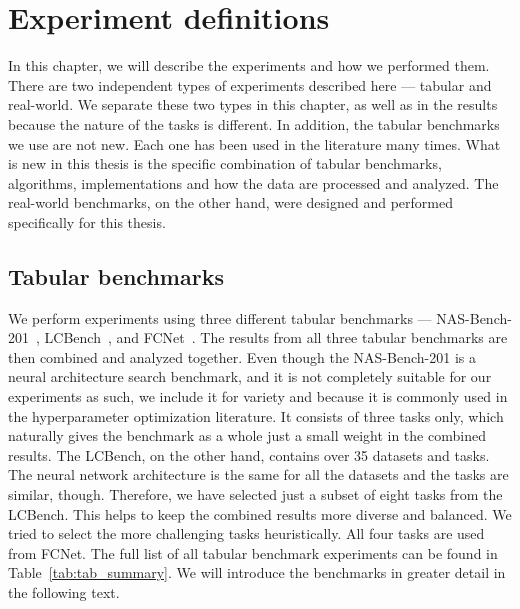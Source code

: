 \chapter{Experiment definitions}
In this chapter, we will describe the experiments and how we performed them. There are two independent types of experiments described here --- tabular and real-world. We separate these two types in this chapter, as well as in the results because the nature of the tasks is different. In addition, the tabular benchmarks we use are not new. Each one has been used in the literature many times. What is new in this thesis is the specific combination of tabular benchmarks, algorithms, implementations and how the data are processed and analyzed. The real-world benchmarks, on the other hand, were designed and performed specifically for this thesis.

\section{Tabular benchmarks}

We perform experiments using three different tabular benchmarks --- NAS-Bench-201~\cite{dong2020nasbench201}, LCBench~\cite{ZimLin2021a}, and FCNet~\cite{klein2019tabular}. The results from all three tabular benchmarks are then combined and analyzed together. Even though the NAS-Bench-201 is a neural architecture search benchmark, and it is not completely suitable for our experiments as such, we include it for variety and because it is commonly used in the hyperparameter optimization literature. It consists of three tasks only, which naturally gives the benchmark as a whole just a small weight in the combined results. The LCBench, on the other hand, contains over 35 datasets and tasks. The neural network architecture is the same for all the datasets and the tasks are similar, though. Therefore, we have selected just a subset of eight tasks from the LCBench. This helps to keep the combined results more diverse and balanced. We tried to select the more challenging tasks heuristically. All four tasks are used from FCNet. The full list of all tabular benchmark experiments can be found in Table~\ref{tab:tab_summary}. We will introduce the benchmarks in greater detail in the following text.

